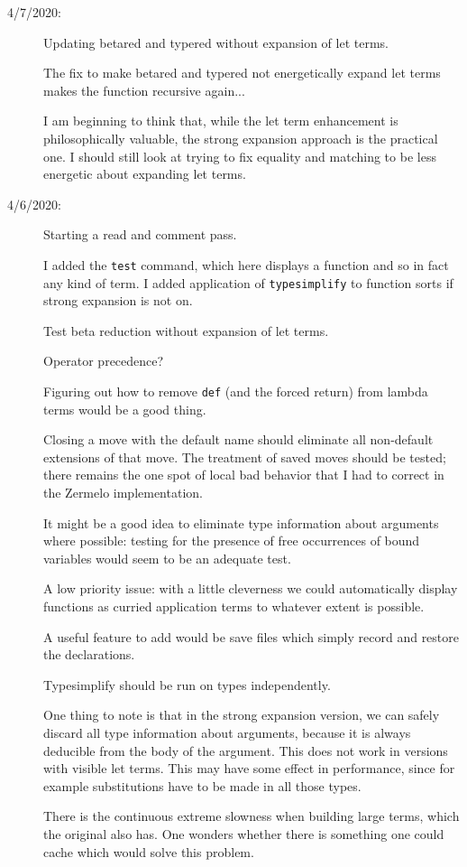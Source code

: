 \documentclass[12pt]{article}
\begin{document}
\begin{description}
\item[4/7/2020:]  Updating betared and typered without expansion of let terms.

The fix to make betared and typered not energetically expand let terms makes the function recursive again...

I am beginning to think that, while the let term enhancement is philosophically valuable, the strong expansion approach is the practical one.  I should still look
at trying to fix equality and matching to be less energetic about expanding let terms.

\item[4/6/2020:]  Starting a read and comment pass.

I added the {\tt test} command, which here displays a function and so in fact any kind of term.  I added application of {\tt typesimplify} to function sorts
if strong expansion is not on.

Test beta reduction without expansion of let terms.

Operator precedence?

Figuring out how to remove {\tt def} (and the forced return) from lambda terms would be a good thing.

Closing a move with the default name should eliminate all non-default extensions of that move.  The treatment of saved moves should be tested;  there remains the one
spot of local bad behavior that I had to correct in the Zermelo implementation.

It might be a good idea to eliminate type information about arguments where possible:  testing for the presence of free occurrences of bound variables would seem to 
be an adequate test.

A low priority issue:  with a little cleverness we could automatically display functions as curried application terms to whatever extent is possible.

A useful feature to add would be save files which simply record and restore the declarations.

Typesimplify should be run on types independently.

One thing to note is that in the strong expansion version, we can safely discard all type information about arguments, because it is always deducible from the body of the argument.
This does not work in versions with visible let terms.  This may have some effect in performance, since for example substitutions have to be made in all those types.

There is the continuous extreme slowness when building large terms, which the original also has.  One wonders whether there is something one could cache which would solve this problem.


\end{description}
\end{document}
